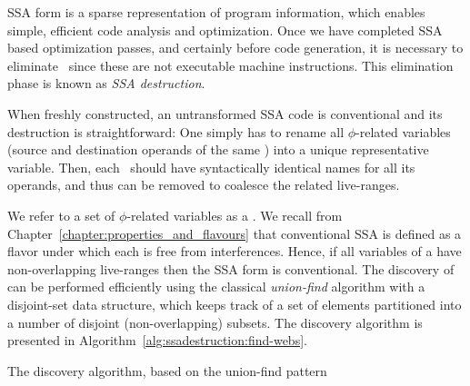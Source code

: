 {SSA form
is a sparse representation of program information,
which enables simple, efficient code analysis and optimization.
Once we have completed SSA based optimization passes,
and certainly before code generation,
it is necessary to eliminate \phifuns\ since these
are not executable machine instructions.
This elimination phase is known as \textit{SSA destruction}.

When freshly constructed, an untransformed SSA code is conventional and its destruction is straightforward:
One simply has to rename all 
$\phi$-related variables (source and destination operands of
the same \phifun)
into a unique representative variable.
Then, each \phifun\ should have syntactically identical
names for all its operands,
and thus can be removed to coalesce the related live-ranges.

We refer to a set of $\phi$-related variables as
a \phiweb.\index{\phiweb} We recall from
Chapter~\ref{chapter:properties_and_flavours}
that conventional SSA is defined as a flavor under which each
\phiweb is free from interferences.
Hence, if all variables of a \phiweb{}
have non-overlapping live-ranges then the SSA form is conventional.
The discovery of \phiwebs can be performed efficiently 
using the classical \textit{union-find} algorithm 
with a disjoint-set data structure,
which keeps track of a set of elements
partitioned into a number of disjoint (non-overlapping) subsets.
The \phiwebs discovery algorithm is presented in 
Algorithm~\ref{alg:ssadestruction:find-webs}.

\begin{algorithm}
\caption{\label{alg:ssadestruction:find-webs}The \phiwebs discovery algorithm, 
based on the union-find pattern}
\end{algorithm}


}
